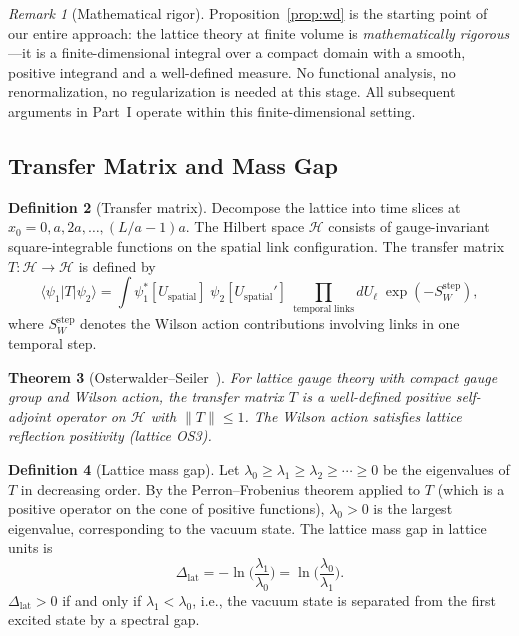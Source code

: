 \documentclass[12pt,a4paper]{article}
\theoremstyle{plain}
\newtheorem{theorem}{Theorem}[section]
\theoremstyle{definition}
\newtheorem{definition}[theorem]{Definition}
\theoremstyle{remark}
\newtheorem{remark}[theorem]{Remark}
\begin{document}
\begin{remark}[Mathematical rigor]
Proposition~\ref{prop:wd} is the starting point of our entire approach: the lattice theory at finite volume is \emph{mathematically rigorous}---it is a finite-dimensional integral over a compact domain with a smooth, positive integrand and a well-defined measure. No functional analysis, no renormalization, no regularization is needed at this stage. All subsequent arguments in Part~I operate within this finite-dimensional setting.
\end{remark}

\subsection{Transfer Matrix and Mass Gap}\label{sec:transfer}

\begin{definition}[Transfer matrix]\label{def:transfer}
Decompose the lattice into time slices at $x_0=0,a,2a,\ldots,(L/a-1)a$. The Hilbert space $\mathcal{H}$ consists of gauge-invariant square-integrable functions on the spatial link configuration. The transfer matrix $T:\mathcal{H}\to\mathcal{H}$ is defined by
\begin{equation}
\langle\psi_1|T|\psi_2\rangle = \int \psi_1^*[U_{\mathrm{spatial}}]\;\psi_2[U_{\mathrm{spatial}}']\;\prod_{\mathrm{temporal\;links}}dU_\ell\;\exp(-S_W^{\mathrm{step}}),
\end{equation}
where $S_W^{\mathrm{step}}$ denotes the Wilson action contributions involving links in one temporal step.
\end{definition}

\begin{theorem}[Osterwalder--Seiler~\cite{OsterwalderSeiler1978}]\label{thm:OS}
For lattice gauge theory with compact gauge group and Wilson action, the transfer matrix $T$ is a well-defined positive self-adjoint operator on $\mathcal{H}$ with $\|T\|\leq 1$. The Wilson action satisfies lattice reflection positivity (lattice OS3).
\end{theorem}

\begin{definition}[Lattice mass gap]\label{def:gap}
Let $\lambda_0\geq\lambda_1\geq\lambda_2\geq\cdots\geq 0$ be the eigenvalues of $T$ in decreasing order. By the Perron--Frobenius theorem applied to $T$ (which is a positive operator on the cone of positive functions), $\lambda_0>0$ is the largest eigenvalue, corresponding to the vacuum state. The lattice mass gap in lattice units is
\begin{equation}\label{eq:gapdef}
\Delta_{\mathrm{lat}} = -\ln\!\Big(\frac{\lambda_1}{\lambda_0}\Big) = \ln\!\Big(\frac{\lambda_0}{\lambda_1}\Big).
\end{equation}
$\Delta_{\mathrm{lat}}>0$ if and only if $\lambda_1<\lambda_0$, i.e., the vacuum state is separated from the first excited state by a spectral gap.
\end{definition}
\end{document}
